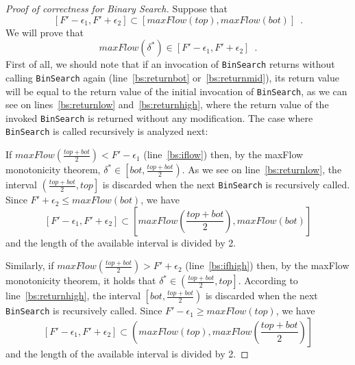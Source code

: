 \begin{proof}[Proof of correctness for Binary Search]
  Suppose that
  \begin{equation*}
    \left[F' - \epsilon_1, F' + \epsilon_2\right] \subset \left[maxFlow\left(top\right), maxFlow\left(bot\right)\right]
    \enspace.
  \end{equation*}
  We will prove that
  \begin{equation*}
    maxFlow\left(\delta^*\right) \in \left[F' - \epsilon_1, F' + \epsilon_2\right] \enspace.
  \end{equation*}
  First of all, we should note that if an invocation of \texttt{BinSearch} returns without calling \texttt{BinSearch} again
  (line~\ref{bs:returnbot} or~\ref{bs:returnmid}), its return value will be equal to the return value of the initial
  invocation of \texttt{BinSearch}, as we can see on lines~\ref{bs:returnlow} and~\ref{bs:returnhigh}, where the return
  value of the invoked \texttt{BinSearch} is returned without any modification. The case where \texttt{BinSearch} is called
  recursively is analyzed next:

  If $maxFlow\left(\frac{top+bot}{2}\right) < F' - \epsilon_1$ (line~\ref{bs:iflow}) then, by the maxFlow monotonicity
  theorem, $\delta^* \in \left[bot,\frac{top+bot}{2}\right)$. As we see on line~\ref{bs:returnlow}, the interval
  $\left(\frac{top+bot}{2}, top\right]$ is discarded when the next \texttt{BinSearch} is recursively called. Since
  $F' + \epsilon_2 \leq maxFlow\left(bot\right)$, we have
  \begin{equation*}
    \left[F' - \epsilon_1, F' + \epsilon_2\right] \subset \left[maxFlow\left(\frac{top+bot}{2}\right),
    maxFlow\left(bot\right)\right]
  \end{equation*}
  and the length of the available interval is divided by 2.

  Similarly, if $maxFlow\left(\frac{top+bot}{2}\right) > F' + \epsilon_2$ (line~\ref{bs:ifhigh}) then, by the maxFlow
  monotonicity theorem, it holds that $\delta^* \in \left(\frac{top+bot}{2}, top\right]$. According to
  line~\ref{bs:returnhigh}, the interval $\left[bot, \frac{top+bot}{2}\right)$ is discarded when the next
  \texttt{BinSearch} is recursively called. Since $F'- \epsilon_1 \geq maxFlow\left(top\right)$, we have
  \begin{equation*}
    \left[F' - \epsilon_1, F' + \epsilon_2\right] \subset \left(maxFlow\left(top\right),
    maxFlow\left(\frac{top+bot}{2}\right)\right]
  \end{equation*}
  and the length of the available interval is divided by 2.


\end{proof}
